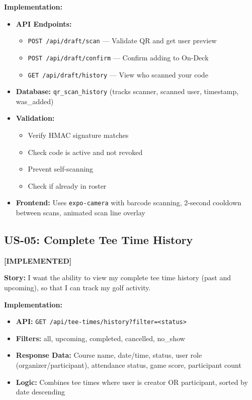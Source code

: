 \documentclass[11pt,a4paper]{article}
\newcommand{\implemented}{\textcolor{implemented}{\textbf{[IMPLEMENTED]}}}
\begin{document}
\textbf{Implementation:}
\begin{itemize}[leftmargin=*]
  \item \textbf{API Endpoints:}
    \begin{itemize}
      \item \texttt{POST /api/draft/scan} --- Validate QR and get user preview
      \item \texttt{POST /api/draft/confirm} --- Confirm adding to On-Deck
      \item \texttt{GET /api/draft/history} --- View who scanned your code
    \end{itemize}
  \item \textbf{Database:} \texttt{qr\_scan\_history} (tracks scanner, scanned user, timestamp, was\_added)
  \item \textbf{Validation:}
    \begin{itemize}
      \item Verify HMAC signature matches
      \item Check code is active and not revoked
      \item Prevent self-scanning
      \item Check if already in roster
    \end{itemize}
  \item \textbf{Frontend:} Uses \texttt{expo-camera} with barcode scanning, 2-second cooldown between scans, animated scan line overlay
\end{itemize}

\subsection{US-05: Complete Tee Time History}
\implemented

\textbf{Story:} I want the ability to view my complete tee time history (past and upcoming), so that I can track my golf activity.

\textbf{Implementation:}
\begin{itemize}[leftmargin=*]
  \item \textbf{API:} \texttt{GET /api/tee-times/history?filter=<status>}
  \item \textbf{Filters:} all, upcoming, completed, cancelled, no\_show
  \item \textbf{Response Data:} Course name, date/time, status, user role (organizer/participant), attendance status, game score, participant count
  \item \textbf{Logic:} Combines tee times where user is creator OR participant, sorted by date descending
\end{itemize}
\end{document}
